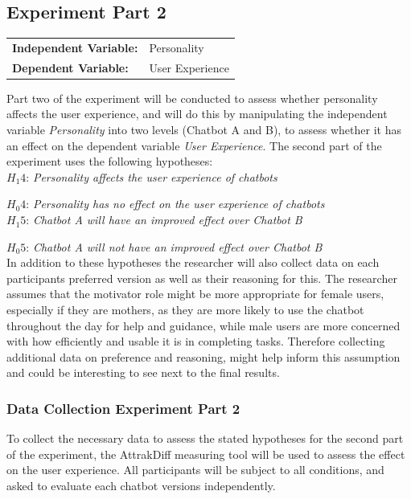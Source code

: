 \subsection{Experiment Part 2}

\vspace{2,5mm}

\begin{tabular}[h]{ l l }
    \textbf{Independent Variable:} & Personality \\ 
    \textbf{Dependent Variable:} & User Experience \\  
\end{tabular}
    
\vspace{2,5mm}

Part two of the experiment will be conducted to assess whether personality affects the user experience, and will do this by manipulating the independent variable \textit{Personality} into two levels (Chatbot A and B), to assess whether it has an effect on the dependent variable \textit{User Experience}. The second part of the experiment uses the following hypotheses:\\
    
    
    $H_1 4$: \textit{Personality affects the user experience of chatbots}
    
    $H_0 4$: \textit{Personality has no effect on the user experience of chatbots} \\
    
    $H_1 5$: \textit{Chatbot A will have an improved effect over Chatbot B} 
    
    $H_0 5$: \textit{Chatbot A will not have an improved effect over Chatbot B} \\
    
    In addition to these hypotheses the researcher will also collect data on each participants preferred version as well as their reasoning for this. The researcher assumes that the motivator role might be more appropriate for female users, especially if they are mothers, as they are more likely to use the chatbot throughout the day for help and guidance, while male users are more concerned with how efficiently and usable it is in completing tasks. Therefore collecting additional data on preference and reasoning, might help inform this assumption and could be interesting to see next to the final results.
    
    \vspace{5mm} %
    
\subsubsection{Data Collection Experiment Part 2}
To collect the necessary data to assess the stated hypotheses for the second part of the experiment, the AttrakDiff measuring tool will be used to assess the effect on the user experience. All participants will be subject to all conditions, and asked to evaluate each chatbot versions independently.

